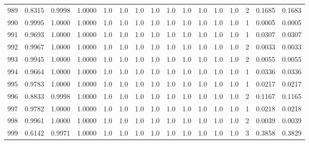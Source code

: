 \begin{tabular}{lrrrrrrrrrrrrrrr}
989 &      0.8315 &  0.9998 &  1.0000 &     1.0 &     1.0 &     1.0 &     1.0 &     1.0 &     1.0 &     1.0 &      1.0 &        1.0 &      2 &                    0.1685 &                     0.1683 \\
990 &      0.9995 &  1.0000 &  1.0000 &     1.0 &     1.0 &     1.0 &     1.0 &     1.0 &     1.0 &     1.0 &      1.0 &        1.0 &      1 &                    0.0005 &                     0.0005 \\
991 &      0.9693 &  1.0000 &  1.0000 &     1.0 &     1.0 &     1.0 &     1.0 &     1.0 &     1.0 &     1.0 &      1.0 &        1.0 &      1 &                    0.0307 &                     0.0307 \\
992 &      0.9967 &  1.0000 &  1.0000 &     1.0 &     1.0 &     1.0 &     1.0 &     1.0 &     1.0 &     1.0 &      1.0 &        1.0 &      2 &                    0.0033 &                     0.0033 \\
993 &      0.9945 &  1.0000 &  1.0000 &     1.0 &     1.0 &     1.0 &     1.0 &     1.0 &     1.0 &     1.0 &      1.0 &        1.0 &      2 &                    0.0055 &                     0.0055 \\
994 &      0.9664 &  1.0000 &  1.0000 &     1.0 &     1.0 &     1.0 &     1.0 &     1.0 &     1.0 &     1.0 &      1.0 &        1.0 &      1 &                    0.0336 &                     0.0336 \\
995 &      0.9783 &  1.0000 &  1.0000 &     1.0 &     1.0 &     1.0 &     1.0 &     1.0 &     1.0 &     1.0 &      1.0 &        1.0 &      1 &                    0.0217 &                     0.0217 \\
996 &      0.8833 &  0.9998 &  1.0000 &     1.0 &     1.0 &     1.0 &     1.0 &     1.0 &     1.0 &     1.0 &      1.0 &        1.0 &      2 &                    0.1167 &                     0.1165 \\
997 &      0.9782 &  1.0000 &  1.0000 &     1.0 &     1.0 &     1.0 &     1.0 &     1.0 &     1.0 &     1.0 &      1.0 &        1.0 &      1 &                    0.0218 &                     0.0218 \\
998 &      0.9961 &  1.0000 &  1.0000 &     1.0 &     1.0 &     1.0 &     1.0 &     1.0 &     1.0 &     1.0 &      1.0 &        1.0 &      2 &                    0.0039 &                     0.0039 \\
999 &      0.6142 &  0.9971 &  1.0000 &     1.0 &     1.0 &     1.0 &     1.0 &     1.0 &     1.0 &     1.0 &      1.0 &        1.0 &      3 &                    0.3858 &                     0.3829 \\
\bottomrule
\end{tabular}
